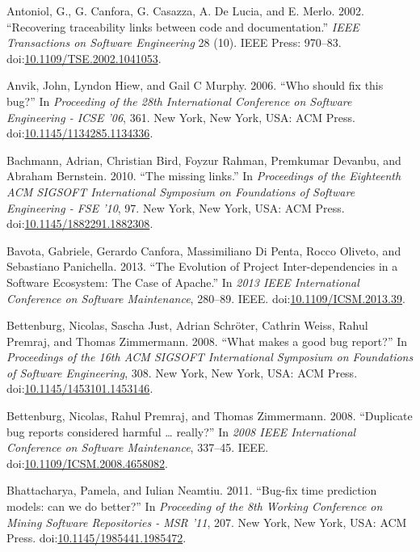 \documentclass[natbib]{svjour3}
\begin{document}
\hypertarget{refs}{}
\hypertarget{ref-Antoniol2002}{}
Antoniol, G., G. Canfora, G. Casazza, A. De Lucia, and E. Merlo. 2002.
``Recovering traceability links between code and documentation.''
\emph{IEEE Transactions on Software Engineering} 28 (10). IEEE Press:
970--83.
doi:\href{https://doi.org/10.1109/TSE.2002.1041053}{10.1109/TSE.2002.1041053}.

\hypertarget{ref-Anvik2006}{}
Anvik, John, Lyndon Hiew, and Gail C Murphy. 2006. ``Who should fix this
bug?'' In \emph{Proceeding of the 28th International Conference on
Software Engineering - ICSE '06}, 361. New York, New York, USA: ACM
Press.
doi:\href{https://doi.org/10.1145/1134285.1134336}{10.1145/1134285.1134336}.

\hypertarget{ref-Bachmann2010}{}
Bachmann, Adrian, Christian Bird, Foyzur Rahman, Premkumar Devanbu, and
Abraham Bernstein. 2010. ``The missing links.'' In \emph{Proceedings of
the Eighteenth ACM SIGSOFT International Symposium on Foundations of
Software Engineering - FSE '10}, 97. New York, New York, USA: ACM Press.
doi:\href{https://doi.org/10.1145/1882291.1882308}{10.1145/1882291.1882308}.

\hypertarget{ref-Bavota2013}{}
Bavota, Gabriele, Gerardo Canfora, Massimiliano Di Penta, Rocco Oliveto,
and Sebastiano Panichella. 2013. ``The Evolution of Project
Inter-dependencies in a Software Ecosystem: The Case of Apache.'' In
\emph{2013 IEEE International Conference on Software Maintenance},
280--89. IEEE.
doi:\href{https://doi.org/10.1109/ICSM.2013.39}{10.1109/ICSM.2013.39}.

\hypertarget{ref-Bettenburg2008}{}
Bettenburg, Nicolas, Sascha Just, Adrian Schröter, Cathrin Weiss, Rahul
Premraj, and Thomas Zimmermann. 2008. ``What makes a good bug report?''
In \emph{Proceedings of the 16th ACM SIGSOFT International Symposium on
Foundations of Software Engineering}, 308. New York, New York, USA: ACM
Press.
doi:\href{https://doi.org/10.1145/1453101.1453146}{10.1145/1453101.1453146}.

\hypertarget{ref-Bettenburg2008a}{}
Bettenburg, Nicolas, Rahul Premraj, and Thomas Zimmermann. 2008.
``Duplicate bug reports considered harmful \ldots{} really?'' In
\emph{2008 IEEE International Conference on Software Maintenance},
337--45. IEEE.
doi:\href{https://doi.org/10.1109/ICSM.2008.4658082}{10.1109/ICSM.2008.4658082}.

\hypertarget{ref-Bhattacharya2011}{}
Bhattacharya, Pamela, and Iulian Neamtiu. 2011. ``Bug-fix time
prediction models: can we do better?'' In \emph{Proceeding of the 8th
Working Conference on Mining Software Repositories - MSR '11}, 207. New
York, New York, USA: ACM Press.
doi:\href{https://doi.org/10.1145/1985441.1985472}{10.1145/1985441.1985472}.
\end{document}
